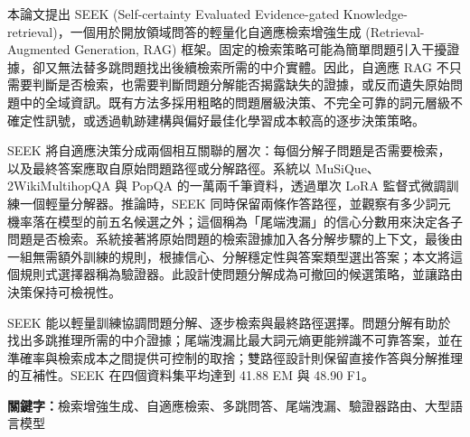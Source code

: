 {\hfuzz=2pt\relax\setlength{\emergencystretch}{2pt}%
本論文提出 SEEK (Self-certainty Evaluated Evidence-gated Knowledge-retrieval)，一個用於開放領域問答的輕量化自適應檢索增強生成 (Retrieval-Augmented Generation, RAG) 框架。固定的檢索策略可能為簡單問題引入干擾證據，卻又無法替多跳問題找出後續檢索所需的中介實體。因此，自適應 RAG 不只需要判斷是否檢索，也需要判斷問題分解能否揭露缺失的證據，或反而遺失原始問題中的全域資訊。既有方法多採用粗略的問題層級決策、不完全可靠的詞元層級不確定性訊號，或透過軌跡建構與偏好最佳化學習成本較高的逐步決策策略。\par}

SEEK 將自適應決策分成兩個相互關聯的層次：每個分解子問題是否需要檢索，以及最終答案應取自原始問題路徑或分解路徑。系統以 MuSiQue、2Wiki\-MultihopQA 與 PopQA 的一萬兩千筆資料，透過單次 LoRA 監督式微調訓練一個輕量分解器。推論時，SEEK 同時保留兩條作答路徑，並觀察有多少詞元機率落在模型的前五名候選之外；這個稱為「尾端洩漏」的信心分數用來決定各子問題是否檢索。系統接著將原始問題的檢索證據加入各分解步驟的上下文，最後由一組無需額外訓練的規則，根據信心、分解穩定性與答案類型選出答案；本文將這個規則式選擇器稱為驗證器。此設計使問題分解成為可撤回的候選策略，並讓路由決策保持可檢視性。

SEEK 能以輕量訓練協調問題分解、逐步檢索與最終路徑選擇。問題分解有助於找出多跳推理所需的中介證據；尾端洩漏比最大詞元熵更能辨識不可靠答案，並在準確率與檢索成本之間提供可控制的取捨；雙路徑設計則保留直接作答與分解推理的互補性。SEEK 在四個資料集平均達到 41.88 EM 與 48.90 F1。

\bigskip
\noindent\textbf{關鍵字：}檢索增強生成、自適應檢索、多跳問答、尾端洩漏、驗證器路由、大型語言模型
